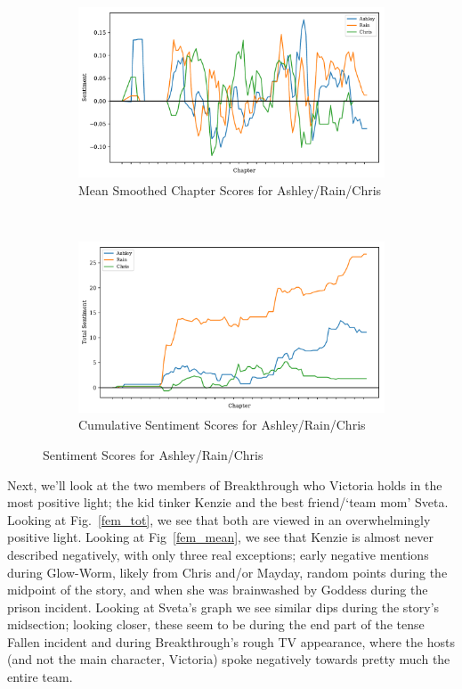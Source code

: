 \documentclass[11pt]{article}
\begin{document}
\begin{figure}[H]
\centering
\begin{subfigure}[t]{0.75\textwidth}
\centering
\includegraphics[width=\textwidth]{ARC Graphs v2/mean_smoothed_sent_scores.pdf}
\caption{Mean Smoothed Chapter Scores for Ashley/Rain/Chris}
\label{arc_mean}
\end{subfigure}
~
\begin{subfigure}[t]{0.75\textwidth}
\centering
\includegraphics[width=\textwidth]{ARC Graphs v2/total_sent_scores.pdf}
\caption{Cumulative Sentiment Scores for Ashley/Rain/Chris}
\label{arc_total}
\end{subfigure}
\label{arc_graphs}
\caption{Sentiment Scores for Ashley/Rain/Chris}
\end{figure}

\noindent
Next, we'll look at the two members of Breakthrough who Victoria holds in the most positive light; the kid tinker Kenzie and the best friend/`team mom' Sveta. Looking at Fig.~\ref{fem_tot}, we see that both are viewed in an overwhelmingly positive light. Looking at Fig~\ref{fem_mean}, we see that Kenzie is almost never described negatively, with only three real exceptions; early negative mentions during Glow-Worm, likely from Chris and/or Mayday, random points during the midpoint of the story, and when she was brainwashed by Goddess during the prison incident. Looking at Sveta's graph we see similar dips during the story's midsection; looking closer, these seem to be during the end part of the tense Fallen incident and during Breakthrough's rough TV appearance, where the hosts (and not the main character, Victoria) spoke negatively towards pretty much the entire team.
\end{document}
